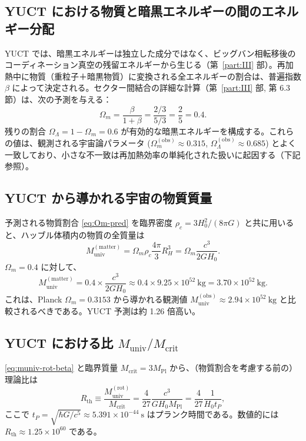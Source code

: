 \documentclass[11pt,a4paper]{article}
\begin{document}
	\subsection{YUCT における物質と暗黒エネルギーの間のエネルギー分配}
	
	YUCT では、暗黒エネルギーは独立した成分ではなく、ビッグバン相転移後のコーディネーション真空の残留エネルギーから生じる（第~\ref{part:III} 部）。再加熱中に物質（重粒子＋暗黒物質）に変換される全エネルギーの割合は、普遍指数 \(\beta\) によって決定される。セクター間結合の詳細な計算（第~\ref{part:III} 部, 第 6.3 節）は、次の予測を与える：
	\begin{equation}
		\Omega_m = \frac{\beta}{1+\beta} = \frac{2/3}{5/3} = \frac{2}{5} = 0.4.
		\label{eq:Om-pred}
	\end{equation}
	残りの割合 \(\Omega_\Lambda = 1 - \Omega_m = 0.6\) が有効的な暗黒エネルギーを構成する。これらの値は、観測される宇宙論パラメータ (\(\Omega_m^{\mathrm{(obs)}} \approx 0.315\), \(\Omega_\Lambda^{\mathrm{(obs)}} \approx 0.685\)) とよく一致しており、小さな不一致は再加熱効率の単純化された扱いに起因する（下記参照）。
	
	\subsection{YUCT から導かれる宇宙の物質質量}
	
	予測される物質割合 \eqref{eq:Om-pred} を臨界密度 \(\rho_c = 3H_0^2/(8\pi G)\) と共に用いると、ハッブル体積内の物質の全質量は
	\begin{equation}
		M_{\mathrm{univ}}^{\mathrm{(matter)}} = \Omega_m \rho_c \frac{4\pi}{3} R_H^3 = \Omega_m \frac{c^3}{2 G H_0}.
		\label{eq:muniv-matter}
	\end{equation}
	\(\Omega_m = 0.4\) に対して、
	\[
	M_{\mathrm{univ}}^{\mathrm{(matter)}} = 0.4 \times \frac{c^3}{2 G H_0} \approx 0.4 \times 9.25\times 10^{52}\ \mathrm{kg} = 3.70\times 10^{52}\ \mathrm{kg}.
	\]
	これは、Planck \(\Omega_m = 0.3153\) から導かれる観測値 \(M_{\mathrm{univ}}^{\mathrm{(obs)}} \approx 2.94\times 10^{52}\ \mathrm{kg}\) と比較されるべきである。YUCT 予測は約 1.26 倍高い。
	
	\subsection{YUCT における比 \(M_{\mathrm{univ}} / M_{\mathrm{crit}}\)}
	
	\eqref{eq:muniv-rot-beta} と臨界質量 \(M_{\mathrm{crit}} = 3 M_{\mathrm{Pl}}\) から、（物質割合を考慮する前の）理論比は
	\begin{equation}
		R_{\mathrm{th}} \equiv \frac{M_{\mathrm{univ}}^{\mathrm{(rot)}}}{M_{\mathrm{crit}}} = \frac{4}{27} \frac{c^3}{G H_0 M_{\mathrm{Pl}}} = \frac{4}{27} \frac{1}{H_0 t_P},
		\label{eq:Rth}
	\end{equation}
	ここで \(t_P = \sqrt{\hbar G / c^5} \approx 5.391\times 10^{-44}\ \mathrm{s}\) はプランク時間である。数値的には \(R_{\mathrm{th}} \approx 1.25\times 10^{60}\) である。
	
\end{document}
